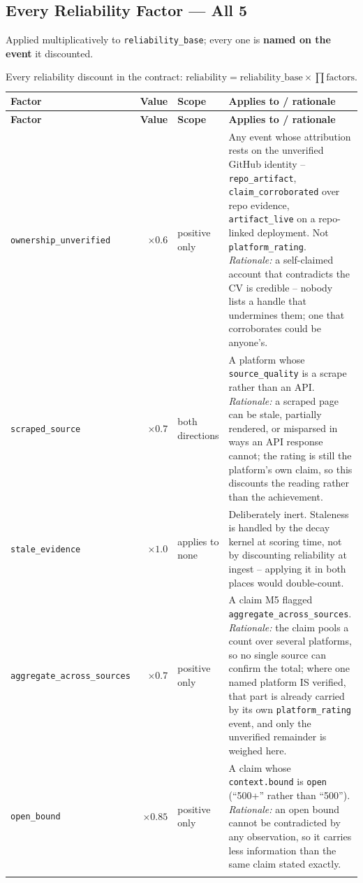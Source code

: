 \documentclass[10pt,a4paper]{article}
\begin{document}
\subsection{Every Reliability Factor --- All 5}

Applied multiplicatively to \texttt{reliability\_base}; every one is
\textbf{named on the event} it discounted.

\begin{longtable}{@{}L{2.9cm}rL{2.0cm}L{7.3cm}@{}}
\toprule
\textbf{Factor} & \textbf{Value} & \textbf{Scope} & \textbf{Applies to / rationale} \\
\midrule
\endfirsthead
\toprule
\textbf{Factor} & \textbf{Value} & \textbf{Scope} & \textbf{Applies to / rationale} \\
\midrule
\endhead
\texttt{ownership\_\allowbreak unverified} & $\times 0.6$ & positive only & Any event whose attribution rests on the unverified GitHub identity -- \texttt{repo\_artifact}, \texttt{claim\_corroborated} over repo evidence, \texttt{artifact\_live} on a repo-linked deployment. Not \texttt{platform\_rating}. \emph{Rationale:} a self-claimed account that contradicts the CV is credible -- nobody lists a handle that undermines them; one that corroborates could be anyone's. \\
\texttt{scraped\_source} & $\times 0.7$ & both directions & A platform whose \texttt{source\_quality} is a scrape rather than an API. \emph{Rationale:} a scraped page can be stale, partially rendered, or misparsed in ways an API response cannot; the rating is still the platform's own claim, so this discounts the reading rather than the achievement. \\
\texttt{stale\_evidence} & $\times 1.0$ & applies to none & Deliberately inert. Staleness is handled by the decay kernel at scoring time, not by discounting reliability at ingest -- applying it in both places would double-count. \\
\texttt{aggregate\_\allowbreak across\_\allowbreak sources} & $\times 0.7$ & positive only & A claim M5 flagged \texttt{aggregate\_across\_sources}. \emph{Rationale:} the claim pools a count over several platforms, so no single source can confirm the total; where one named platform IS verified, that part is already carried by its own \texttt{platform\_rating} event, and only the unverified remainder is weighed here. \\
\texttt{open\_bound} & $\times 0.85$ & positive only & A claim whose \texttt{context.bound} is \texttt{open} (``500+'' rather than ``500''). \emph{Rationale:} an open bound cannot be contradicted by any observation, so it carries less information than the same claim stated exactly. \\
\bottomrule
\caption{Every reliability discount in the contract:
$\text{reliability} = \text{reliability\_base} \times \prod \text{factors}$.}
\end{longtable}
\end{document}
